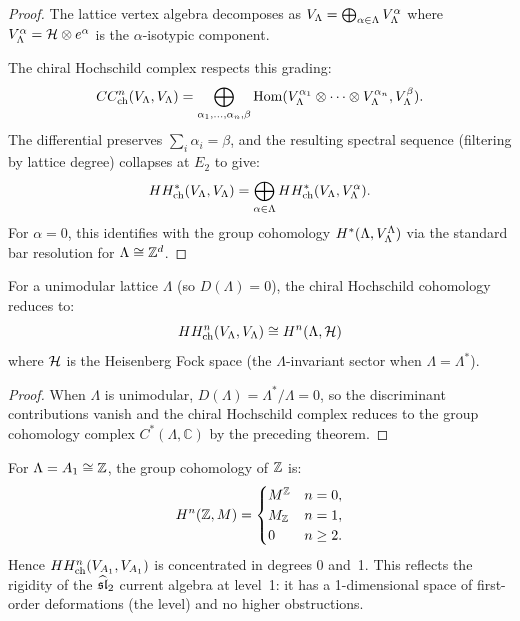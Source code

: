 \begin{proof}
The lattice vertex algebra decomposes as
$V_\Lambda = \bigoplus_{\alpha \in \Lambda} V_\Lambda^\alpha$
where $V_\Lambda^\alpha = \mathcal{H} \otimes e^\alpha$ is the
$\alpha$-isotypic component.

The chiral Hochschild complex respects this grading:
\[
CC^n_{\mathrm{ch}}(V_\Lambda, V_\Lambda)
= \bigoplus_{\alpha_1, \ldots, \alpha_n, \beta}
\operatorname{Hom}(V_\Lambda^{\alpha_1} \otimes \cdots
\otimes V_\Lambda^{\alpha_n}, V_\Lambda^\beta).
\]
The differential preserves $\sum_i \alpha_i = \beta$, and the
resulting spectral sequence (filtering by lattice degree)
collapses at $E_2$ to give:
\[
HH^*_{\mathrm{ch}}(V_\Lambda, V_\Lambda)
= \bigoplus_{\alpha \in \Lambda}
HH^*_{\mathrm{ch}}(V_\Lambda, V_\Lambda^\alpha).
\]
For $\alpha = 0$, this identifies with the group cohomology
$H^*(\Lambda, V_\Lambda^{\Lambda})$ via the standard bar resolution
for $\Lambda \cong \mathbb{Z}^d$.
\end{proof}

\begin{corollary}\label{cor:lattice:hochschild-unimodular}
For a unimodular lattice $\Lambda$ (so $D(\Lambda) = 0$), the chiral
Hochschild cohomology reduces to:
\[
HH^n_{\mathrm{ch}}(V_\Lambda, V_\Lambda)
\cong H^n(\Lambda, \mathcal{H})
\]
where $\mathcal{H}$ is the Heisenberg Fock space (the $\Lambda$-invariant
sector when $\Lambda = \Lambda^*$).
\end{corollary}
\begin{proof}
When $\Lambda$ is unimodular, $D(\Lambda) = \Lambda^*/\Lambda = 0$, so the discriminant contributions vanish and the chiral Hochschild complex reduces to the group cohomology complex $C^*(\Lambda, \mathbb{C})$ by the preceding theorem.
\end{proof}

\begin{example}\label{ex:lattice:hochschild-A1}
For $\Lambda = A_1 \cong \mathbb{Z}$, the group cohomology of $\mathbb{Z}$ is:
\[
H^n(\mathbb{Z}, M) =
\begin{cases}
M^{\mathbb{Z}} & n = 0, \\
M_{\mathbb{Z}} & n = 1, \\
0 & n \geq 2.
\end{cases}
\]
Hence $HH^n_{\mathrm{ch}}(V_{A_1}, V_{A_1})$ is concentrated
in degrees 0 and~1. This reflects the rigidity of the $\widehat{\mathfrak{sl}}_2$
current algebra at level~1: it has a 1-dimensional space of first-order
deformations (the level) and no higher obstructions.
\end{example}



